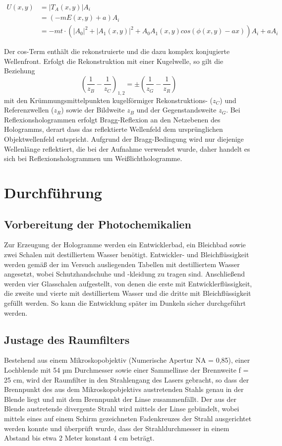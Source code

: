 \documentclass[bigchapter,colorback,accentcolor=tud4b,linedtoc,11pt]{tudreport}
\begin{document}
\begin{align*}
U(x,y) &= |T_A(x,y)| A_i \\
       &= (-m E(x,y) + a) A_i \\
       &= -mt \cdot \left( |A_0|^2 + |A_1(x,y)|^2 + A_0 A_1(x,y) cos(\phi (x,y) -ax) \right) A_i + aA_i
\end{align*}

Der cos-Term enthält die rekonstruierte und die dazu komplex konjugierte Wellenfront. Erfolgt die Rekonstruktion mit einer Kugelwelle, so gilt die Beziehung
$$\left( \frac{1}{z_B}- \frac{1}{z_C} \right)_{1,2} = \pm \left( \frac{1}{z_G}- \frac{1}{z_R} \right) $$
mit den Krümmungsmittelpunkten kugelförmiger Rekonstruktions- ($z_C$) und Referenzwellen ($z_R$) sowie der Bildweite $z_B$ und der Gegenstandsweite $z_G$. 
Bei Reflexionshologrammen erfolgt Bragg-Reflexion an den Netzebenen des Hologramms, derart dass das reflektierte Wellenfeld dem ursprünglichen Objektwellenfeld entspricht. Aufgrund der Bragg-Bedingung wird nur diejenige Wellenlänge reflektiert, die bei der Aufnahme verwendet wurde, daher handelt es sich bei Reflexionshologrammen um Weißlichthologramme.

\chapter{Durchführung}

\section{Vorbereitung der Photochemikalien}

Zur Erzeugung der Hologramme werden ein Entwicklerbad, ein Bleichbad sowie zwei Schalen mit destilliertem Wasser benötigt. Entwickler- und Bleichflüssigkeit werden gemäß der im Versuch ausliegenden Tabellen mit destilliertem Wasser angesetzt, wobei Schutzhandschuhe und -kleidung zu tragen sind. Anschließend werden vier Glasschalen aufgestellt, von denen die erste mit Entwicklerflüssigkeit, die zweite und vierte mit destilliertem Wasser und die dritte mit Bleichflüssigkeit gefüllt werden. So kann die Entwicklung später im Dunkeln sicher durchgeführt werden.

\section{Justage des Raumfilters}

Bestehend aus einem Mikroskopobjektiv (Numerische Apertur NA = 0,85), einer Lochblende mit 54 µm Durchmesser sowie einer Sammellinse der Brennweite f = 25 cm, wird der Raumfilter in den Strahlengang des Lasers gebracht, so dass der Brennpunkt des aus dem Mikroskopobjektivs austretenden Stahls genau in der Blende liegt und mit dem Brennpunkt der Linse zusammenfällt. Der aus der Blende austretende divergente Strahl wird mittels der Linse gebündelt, wobei mittels eines auf einem Schirm gezeichneten Fadenkreuzes der Strahl ausgerichtet werden konnte und überprüft wurde, dass der Strahldurchmesser in einem Abstand bis etwa 2 Meter konstant 4 cm beträgt.
\end{document}
